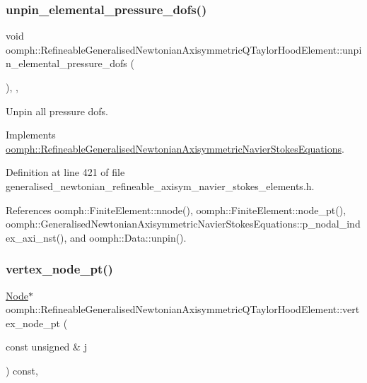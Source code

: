 \subsubsection{\texorpdfstring{unpin\+\_\+elemental\+\_\+pressure\+\_\+dofs()}{unpin\_elemental\_pressure\_dofs()}}
{\footnotesize\ttfamily void oomph\+::\+Refineable\+Generalised\+Newtonian\+Axisymmetric\+Q\+Taylor\+Hood\+Element\+::unpin\+\_\+elemental\+\_\+pressure\+\_\+dofs (\begin{DoxyParamCaption}{ }\end{DoxyParamCaption})\hspace{0.3cm}{\ttfamily [inline]}, {\ttfamily [private]}, {\ttfamily [virtual]}}



Unpin all pressure dofs. 



Implements \hyperlink{classoomph_1_1RefineableGeneralisedNewtonianAxisymmetricNavierStokesEquations_adec2514256f89cd8ff2694abd8178675}{oomph\+::\+Refineable\+Generalised\+Newtonian\+Axisymmetric\+Navier\+Stokes\+Equations}.



Definition at line 421 of file generalised\+\_\+newtonian\+\_\+refineable\+\_\+axisym\+\_\+navier\+\_\+stokes\+\_\+elements.\+h.



References oomph\+::\+Finite\+Element\+::nnode(), oomph\+::\+Finite\+Element\+::node\+\_\+pt(), oomph\+::\+Generalised\+Newtonian\+Axisymmetric\+Navier\+Stokes\+Equations\+::p\+\_\+nodal\+\_\+index\+\_\+axi\+\_\+nst(), and oomph\+::\+Data\+::unpin().

\mbox{\label{classoomph_1_1RefineableGeneralisedNewtonianAxisymmetricQTaylorHoodElement_a8cf45d940ce7566f21df30d8e875fd65}} 
\subsubsection{\texorpdfstring{vertex\+\_\+node\+\_\+pt()}{vertex\_node\_pt()}}
{\footnotesize\ttfamily \hyperlink{classoomph_1_1Node}{Node}$\ast$ oomph\+::\+Refineable\+Generalised\+Newtonian\+Axisymmetric\+Q\+Taylor\+Hood\+Element\+::vertex\+\_\+node\+\_\+pt (\begin{DoxyParamCaption}\item[{const unsigned \&}]{j }\end{DoxyParamCaption}) const\hspace{0.3cm}{\ttfamily [inline]}, {\ttfamily [virtual]}}



